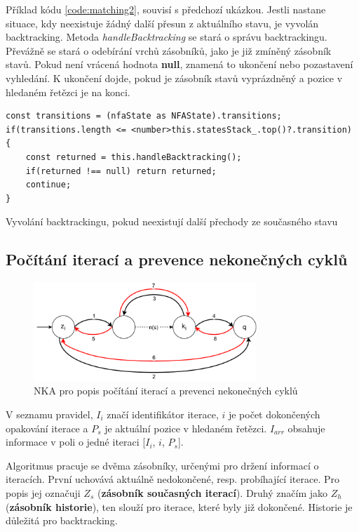 Příklad kódu \ref{code:matching2}, souvisí s předchozí ukázkou. 
Jestli nastane situace, kdy neexistuje žádný další přesun z aktuálního stavu, je vyvolán backtracking.
Metoda \textit{handleBacktracking} se stará o správu backtrackingu.
Převážně se stará o odebírání vrchů zásobníků, jako je již zmíněný zásobník stavů.
Pokud není vrácená hodnota \textbf{null}, znamená to ukončení nebo pozastavení vyhledání.
K ukončení dojde, pokud je zásobník stavů vyprázdněný a pozice v hledaném řetězci je na konci.

\begin{code}[!ht]
	\begin{verbatim}
const transitions = (nfaState as NFAState).transitions;
if(transitions.length <= <number>this.statesStack_.top()?.transition)
{
	const returned = this.handleBacktracking();
	if(returned !== null) return returned;
	continue;
}
	\end{verbatim}
	\caption{Vyvolání backtrackingu, pokud neexistují další přechody ze současného stavu}
	\label{code:matching2}
\end{code}

\newpage

\subsection*{Počítání iterací a prevence nekonečných cyklů}

\begin{figure}[!h]
	\centering
	\includegraphics[width=0.75\textwidth]{Figures/IterationCount.pdf}
	\caption{NKA pro popis počítání iterací a prevenci nekonečných cyklů}
	\label{fig:ITERCNT}
\end{figure}

V seznamu pravidel, $I_i$ značí identifikátor iterace, $i$ je počet dokončených opakování iterace a $P_s$ je aktuální pozice v hledaném řetězci.
$I_{arr}$ obsahuje informace v poli o jedné iteraci [$I_i$, $i$, $P_s$].

Algoritmus pracuje se dvěma zásobníky, určenými pro držení informací o iteracích. 
První uchovává aktuálně nedokončené, resp. probíhající iterace. 
Pro popis jej označuji $Z_s$ (\textbf{zásobník současných iterací}).
Druhý značím jako $Z_h$ (\textbf{zásobník historie}), ten slouží pro iterace, které byly již dokončené.
Historie je důležitá pro backtracking.

